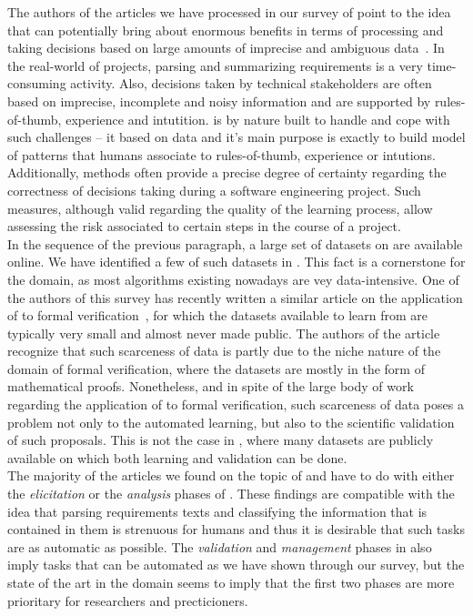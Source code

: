 The authors of the articles we have processed in our survey of point
to the idea that \ML can potentially bring about enormous benefits in terms of
processing and taking decisions based on  large amounts of imprecise and
ambiguous data~\cite{some citations here}. In the real-world of projects,
parsing and summarizing requirements is a very time-consuming activity. Also,
decisions taken by technical stakeholders are often based on imprecise,
incomplete and noisy information and are supported by rules-of-thumb, experience
and intutition. \ML is by nature built to handle and cope with such challenges
-- it based on data and it's main purpose is exactly to build model of patterns
that humans associate to rules-of-thumb, experience or intutions. Additionally,
\ML methods often provide a precise degree of certainty regarding the
correctness of decisions taking during a software engineering project. Such
measures, although valid regarding the quality of the learning process, allow
assessing the risk associated to certain steps in the course of a project.\\

In the sequence of the previous paragraph, a large set of datasets
on \RE are available online. We have identified a few of such datasets in
. This fact is a cornerstone for the domain, as most \ML
algorithms existing nowadays are vey data-intensive. One of the authors of this
survey has recently written a similar article on the application of \ML to
formal verification~\cite{AmLuBi:2018}, for which the datasets available
to learn from are typically very small and almost never made public. The authors
of the article recognize that such scarceness of data is partly due to the niche
nature of the domain of formal verification, where the datasets are mostly in
the form of mathematical proofs. Nonetheless, and in spite of the large body of
work regarding the application of \ML to formal verification, such scarceness of
data poses a problem not only to the automated learning, but also to the
scientific validation of such proposals. This is not the case in \RE, where many
datasets are publicly available on which both learning and validation can be
done.\\

The majority of the articles we found on the topic of \ML and \RE have to do
with either the \emph{elicitation} or the \emph{analysis} phases of \RE{}. These findings are compatible with the idea that parsing
requirements texts and classifying the information that is contained in them is
strenuous for humans and thus it is desirable that such tasks are as automatic
as possible. The \emph{validation} and \emph{management} phases in \RE also
imply tasks that can be automated as we have shown through our survey, but
the state of the art in the domain seems to imply that the first two phases are
more prioritary for researchers and precticioners.\\


